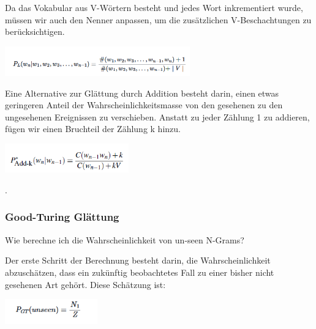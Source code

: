 \documentclass[12pt]{article}
\begin{document}
Da das Vokabular aus V-Wörtern besteht und jedes Wort inkrementiert wurde, müssen wir auch den Nenner anpassen, um die zusätzlichen V-Beschachtungen zu berücksichtigen.
\begin{center}
	\includegraphics[width=0.6\textwidth]{statics/Borisov/3.PNG}
\end{center}

\cite{maucher2022}

Eine Alternative zur Glättung durch Addition besteht darin, einen etwas geringeren Anteil der Wahrscheinlichkeitsmasse von den gesehenen zu den ungesehenen Ereignissen zu verschieben. Anstatt zu jeder Zählung 1 zu addieren, fügen wir einen Bruchteil der Zählung k hinzu.
\begin{center}
	\includegraphics[width=0.4\textwidth]{statics/Borisov/4.PNG}
\end{center}

\cite{jurafsky2023}.

\subsubsection{Good-Turing Glättung}
Wie berechne ich die Wahrscheinlichkeit von un-seen N-Grams?

Der erste Schritt der Berechnung besteht darin, die Wahrscheinlichkeit abzuschätzen, dass ein zukünftig beobachtetes Fall zu einer bisher nicht gesehenen Art gehört. Diese Schätzung ist:
\begin{center}
	\includegraphics[width=0.3\textwidth]{statics/Borisov/5.PNG}
\end{center}
\end{document}
